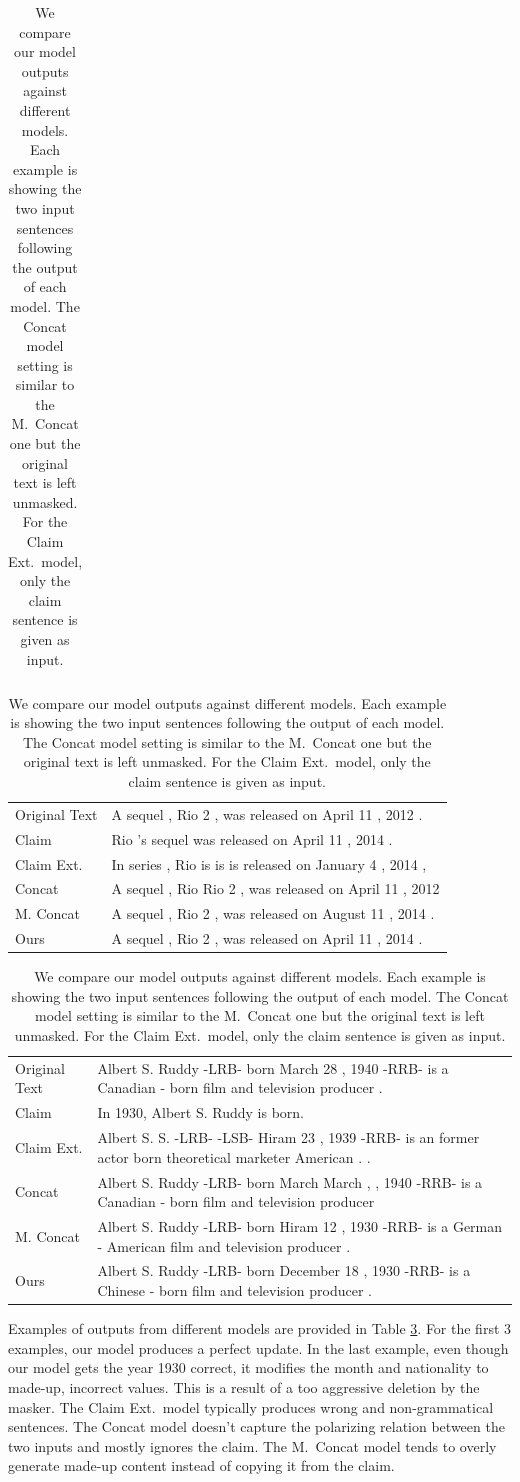 \documentclass[letterpaper]{article} %
\newcommand{\tabref}[1]{Table \ref{#1}}
\begin{document}
\begin{table}[t]
\begin{tabular}{p{3cm}|p{11cm}}
    \end{tabular}
    \begin{tabular}{p{3cm}|p{11cm}}
    \toprule
      Original Text &  A sequel , Rio 2 , was released on April 11 , 2012 .\\
      Claim &  Rio 's sequel was released on April 11 , 2014 .\\
    \midrule
      Claim Ext. & In series , Rio is is is released on January 4 , 2014 ,\\
      Concat & A sequel , Rio Rio 2 , was released on April 11 , 2012 \\
      M. Concat   &  A sequel , Rio 2 , was released on August 11 , 2014 . \\
      Ours  & A sequel , Rio 2 , was released on April 11 , 2014 .\\
  \end{tabular}
  \begin{tabular}{p{3cm}|p{11cm}}
    \toprule
      Original Text & Albert S. Ruddy -LRB- born March 28 , 1940 -RRB- is a Canadian - born film and television producer . \\
      Claim & In 1930, Albert S. Ruddy is born.\\
    \midrule
      Claim Ext. & Albert S. S. -LRB- -LSB- Hiram 23 , 1939 -RRB- is an former actor born theoretical marketer American . .\\
      Concat & Albert S. Ruddy -LRB- born March March , , 1940 -RRB- is a Canadian - born film and television producer \\
      M. Concat   &  Albert S. Ruddy -LRB- born Hiram 12 , 1930 -RRB- is a German - American film and television producer . \\
      Ours  & Albert S. Ruddy -LRB- born December 18 , 1930 -RRB- is a Chinese - born film and television producer .\\
      \toprule
  \end{tabular}
  \caption{We compare our model outputs against different models. Each example is showing the two input sentences following the output of each model. The Concat model setting is similar to the M.\ Concat one but the original text is left unmasked. For the Claim Ext.\ model, only the claim sentence is given as input. }
  
  \label{tab:example_outputs}
\end{table}


Examples of outputs from different models are provided in \tabref{tab:example_outputs}.
For the first 3 examples, our model produces a perfect update.
In the last example, even though our model gets the year 1930 correct, it modifies the month and nationality to made-up, incorrect values. This is a result of a too aggressive deletion by the masker.
The Claim Ext.\ model typically produces wrong and non-grammatical sentences. The Concat model doesn't capture the polarizing relation between the two inputs and mostly ignores the claim. The M.\ Concat model tends to overly generate made-up content instead of copying it from the claim.
\end{document}
